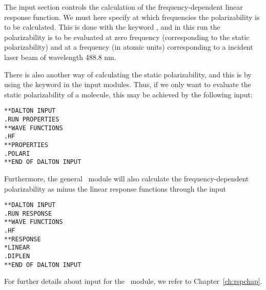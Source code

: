 The  input section controls the calculation of the
frequency-dependent linear response
function.
We must here specify at which frequencies the polarizability is
to be calculated. This is done with the keyword , and in
this run the polarizability is to be evaluated at zero frequency
(corresponding to the static polarizability) and at a frequency (in
atomic units) corresponding to a incident laser beam of wavelength
488.8 nm.

There is also another way of calculating the static
 polarizability, and this is by using the
keyword  in the  input modules. Thus, if we only
want to evaluate the static polarizability of a molecule, this may be
achieved by the following input:

\begin{verbatim}
**DALTON INPUT
.RUN PROPERTIES
**WAVE FUNCTIONS
.HF
**PROPERTIES
.POLARI
**END OF DALTON INPUT
\end{verbatim}

Furthermore, the general \response\ module will also calculate the
frequency-dependent polarizability
as minus the linear response functions through the input


\begin{verbatim}
**DALTON INPUT
.RUN RESPONSE
**WAVE FUNCTIONS
.HF
**RESPONSE
*LINEAR
.DIPLEN
**END OF DALTON INPUT
\end{verbatim}
For further details about input for the \response\ module, we refer
to Chapter~\ref{ch:rspchap}.
